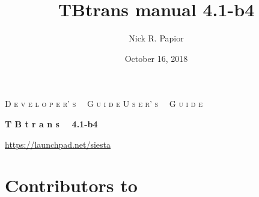 %
%
%
%



\title{TBtrans manual 4.1-b4}

\date{October 16, 2018}

\author{%
    Nick R. Papior%
}

\setpdfmetadata




\begin{titlepage}

\begin{center}

\vspace{1cm}
\ifdeveloper
 {\Huge \textsc{D e v e l o p e r' s \, \, G u i d e}}
\else
 {\Huge \textsc{U s e r' s \, \, G u i d e}}
\fi

\vspace{1cm}
\hrulefill
\vspace{1cm}

{\Huge \textbf{T B t r a n s \, \, 4.1-b4}}

\vspace{1cm}
\hrulefill
\vspace{0.5cm}

{\Large \printdate}

\vspace{1.5cm}
{\Large \url{https://launchpad.net/siesta}}

\end{center}

\end{titlepage}


\newpage

\section*{Contributors to \tbtrans}

